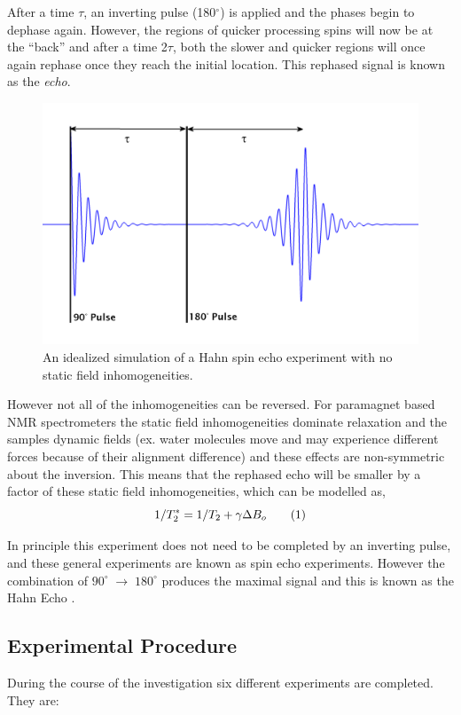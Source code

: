 After a time $\tau$, an inverting pulse (180$^\circ$) is applied and the phases begin to dephase again. However, the regions of quicker processing spins will now be at the ``back'' and after a time 2$\tau$, both the slower and quicker regions will once again rephase once they reach the initial location. This rephased signal is known as the \textit{echo}.

\begin{figure}[H]
    \centering
    \includegraphics[width=.75\textwidth]{figures/spin_echo_ideal.png}
    \caption{An idealized simulation of a Hahn spin echo experiment with no static field inhomogeneities.}
    \label{fig:Echo}
\end{figure}

However not all of the inhomogeneities can be reversed. For paramagnet based NMR spectrometers the static field inhomogeneities dominate relaxation and the samples dynamic fields (ex. water molecules move and may experience different forces because of their alignment difference) and these effects are non-symmetric about the inversion. This means that the rephased echo will be smaller by a factor of these static field inhomogeneities, which can be modelled as, 
\[ 1/T^*_2 = 1/T_2 + \gamma \Delta B_o \numberthis \label{eqn:Hanecho} \]

In principle this experiment does not need to be completed by an inverting pulse, and these general experiments are known as spin echo experiments. However the combination of $90^\circ \; \rightarrow \; 180^\circ$ produces the maximal signal and this is known as the Hahn Echo \cite{hahn1950spin}.

\subsection{Experimental Procedure} 

During the course of the investigation six different experiments are completed. They are:

